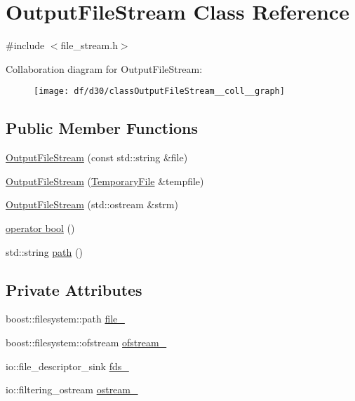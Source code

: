 \hypertarget{classOutputFileStream}{}\section{Output\+File\+Stream Class Reference}
\label{classOutputFileStream}


{\ttfamily \#include $<$file\+\_\+stream.\+h$>$}



Collaboration diagram for Output\+File\+Stream\+:
\nopagebreak
\begin{figure}[H]
\begin{center}
\leavevmode
\texttt{[image: df/d30/classOutputFileStream\_\_coll\_\_graph]}
\end{center}
\end{figure}
\subsection*{Public Member Functions}
\begin{DoxyCompactItemize}
\item 
\hyperlink{classOutputFileStream_ac54b17b58f6e5b0d4c7501653509cd72}{Output\+File\+Stream} (const std\+::string \&file)
\item 
\hyperlink{classOutputFileStream_a0c7bcfd4249febd21db08260c03c24d2}{Output\+File\+Stream} (\hyperlink{classTemporaryFile}{Temporary\+File} \&tempfile)
\item 
\hyperlink{classOutputFileStream_a36f879a33f90ac39d6cacfd2da3903fd}{Output\+File\+Stream} (std\+::ostream \&strm)
\item 
\hyperlink{classOutputFileStream_ac2db8a549eba8c5889a676d35cd5cb8d}{operator bool} ()
\item 
std\+::string \hyperlink{classOutputFileStream_a81370262d005a6f9fe9174c1ed2b6ea2}{path} ()
\end{DoxyCompactItemize}
\subsection*{Private Attributes}
\begin{DoxyCompactItemize}
\item 
boost\+::filesystem\+::path \hyperlink{classOutputFileStream_a507392eedcce53121fa100aa45e1dc86}{file\+\_\+}
\item 
boost\+::filesystem\+::ofstream \hyperlink{classOutputFileStream_a75f268bdd0977b6e16eca85effdae7ed}{ofstream\+\_\+}
\item 
io\+::file\+\_\+descriptor\+\_\+sink \hyperlink{classOutputFileStream_ae904a4f9b831d34c667118c9dada39de}{fds\+\_\+}
\item 
io\+::filtering\+\_\+ostream \hyperlink{classOutputFileStream_ab2ea25eb576078ee0998e7c53d6034a7}{ostream\+\_\+}
\end{DoxyCompactItemize}
